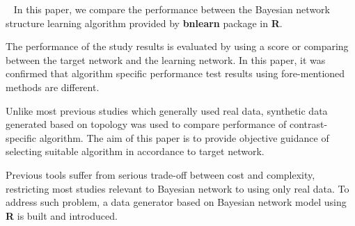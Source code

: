 \vspace{1cm} {\small \ \indent
In this paper, we compare the performance between the Bayesian network structure learning algorithm provided by \textbf{bnlearn} package in \textbf{R}.

The performance of the study results is evaluated by using a score or comparing between the target network and the learning network. In this paper, it was confirmed that algorithm specific performance test results using fore-mentioned methods are different.

Unlike most previous studies which generally used real data, synthetic data generated based on topology was used to compare performance of contrast-specific algorithm. The aim of this paper is to provide objective guidance of selecting suitable algorithm in accordance to target network.

Previous tools suffer from serious trade-off between cost and complexity, restricting most studies relevant to Bayesian network to using only real data. To address such problem, a data generator based on Bayesian network model using \textbf{R} is built and introduced.
} 